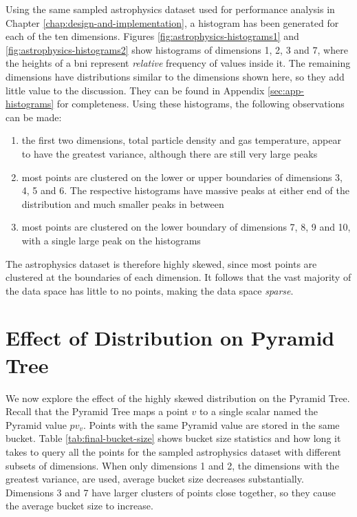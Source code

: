 Using the same sampled astrophysics dataset used for performance analysis in Chapter \ref{chap:design-and-implementation}, a histogram has been generated for each of the ten dimensions. Figures \ref{fig:astrophysics-histograms1} and \ref{fig:astrophysics-histograms2} show histograms of dimensions 1, 2, 3 and 7, where the heights of a bni represent \textit{relative} frequency of values inside it. The remaining dimensions have distributions similar to the dimensions shown here, so they add little value to the discussion. They can be found in Appendix \ref{sec:app-histograms} for completeness. Using these histograms, the following observations can be made:
\begin{enumerate}
	\item the first two dimensions, total particle density and gas temperature, appear to have the greatest variance, although there are still very large peaks
	\item most points are clustered on the lower or upper boundaries of dimensions 3, 4, 5 and 6. The respective histograms have massive peaks at either end of the distribution and much smaller peaks in between
	\item most points are clustered on the lower boundary of dimensions 7, 8, 9 and 10, with a single large peak on the histograms
\end{enumerate}
The astrophysics dataset is therefore highly skewed, since most points are clustered at the boundaries of each dimension. It follows that the vast majority of the data space has little to no points, making the data space \textit{sparse}.

\section{Effect of Distribution on Pyramid Tree}

We now explore the effect of the highly skewed distribution on the Pyramid Tree. Recall that the Pyramid Tree maps a point $v$ to a single scalar named the Pyramid value $pv_v$. Points with the same Pyramid value are stored in the same bucket. Table \ref{tab:final-bucket-size} shows bucket size statistics and how long it takes to query all the points for the sampled astrophysics dataset with different subsets of dimensions. When only dimensions 1 and 2, the dimensions with the greatest variance, are used, average bucket size decreases substantially. Dimensions 3 and 7 have larger clusters of points close together, so they cause the average bucket size to increase.

